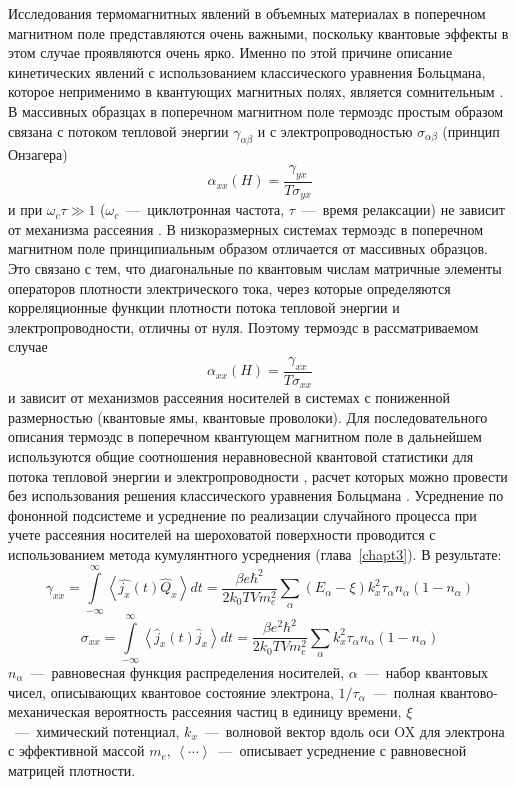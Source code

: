Исследования термомагнитных явлений в объемных материалах в поперечном магнитном поле представляются очень важными, поскольку квантовые эффекты в этом случае проявляются очень ярко. Именно по этой причине описание кинетических явлений с использованием классического уравнения Больцмана, которое неприменимо в квантующих магнитных полях, является сомнительным \cite{Askerov1970}. В массивных образцах в поперечном магнитном поле термоэдс простым образом связана с потоком тепловой энергии $\gamma_{\alpha\beta}$ и с электропроводностью $\sigma_{\alpha\beta}$ (принцип Онзагера)
\[
	\alpha_{xx}(H) = \frac{\gamma_{yx}}{T \sigma_{yx}}
\]
и при $\omega_c \tau \gg 1$ ($\omega_c$~---~циклотронная частота, $\tau$~---~время релаксации) не зависит от механизма рассеяния \cite{Askerov1970}. В низкоразмерных системах термоэдс в поперечном магнитном поле принципиальным образом отличается от массивных образцов. Это связано с тем, что диагональные по квантовым числам матричные элементы операторов плотности электрического тока, через которые определяются корреляционные функции плотности потока тепловой энергии и электропроводности, отличны от нуля. Поэтому термоэдс в рассматриваемом случае
\begin{equation} \label{eq:44_05}
	\alpha_{xx}(H) = \frac{\gamma_{xx}}{T \sigma_{xx}}
\end{equation}
и зависит от механизмов рассеяния носителей в системах с пониженной размерностью (квантовые ямы, квантовые проволоки). Для последовательного описания термоэдс в поперечном квантующем магнитном поле в дальнейшем используются общие соотношения неравновесной квантовой статистики для потока тепловой энергии и электропроводности \cite{Kubo1957}, расчет которых можно провести без использования решения классического уравнения Больцмана \cite{Khamidullin2002}. Усреднение по фононной подсистеме и усреднение по реализации случайного процесса при учете рассеяния носителей на шероховатой поверхности проводится с использованием метода кумулянтного усреднения (глава~\ref{chapt3}). В результате:
\begin{equation} \label{eq:44_07}
	\gamma_{xx} = \int\limits_{- \infty }^{\infty}{\left\langle \hat{j_x}(t) \hat{Q}_x \right\rangle  dt} =
	\frac{\beta e \hbar^2 }{2 k_0 TV m_e^2} \sum_{\alpha}{\left( E_{\alpha} - \xi \right) k_x^2 \tau_{\alpha} n_{\alpha}\left( 1 - n_{\alpha} \right) }
\end{equation}
\begin{equation} \label{eq:44_08}
	\sigma_{xx} = \int\limits_{- \infty }^{\infty}{\left\langle \hat{j}_x(t) \hat{j}_x \right\rangle  dt} =
	\frac{\beta e^2 \hbar^2 }{2 k_0 T V m_e^2} \sum_{\alpha}{k_x^2 \tau_{\alpha} n_{\alpha}\left( 1 - n_{\alpha} \right) }
\end{equation}
$n_{\alpha}$~---~равновесная функция распределения носителей, $\alpha$~---~набор квантовых чисел, описывающих квантовое состояние электрона, $1/\tau_{\alpha}$~---~полная квантово-механическая вероятность рассеяния частиц в единицу времени, $\xi$~---~химический потенциал, $k_x$~---~волновой вектор вдоль оси OX для электрона с эффективной массой $m_e$, $\left\langle \cdots \right\rangle$~---~описывает усреднение с равновесной матрицей плотности.

